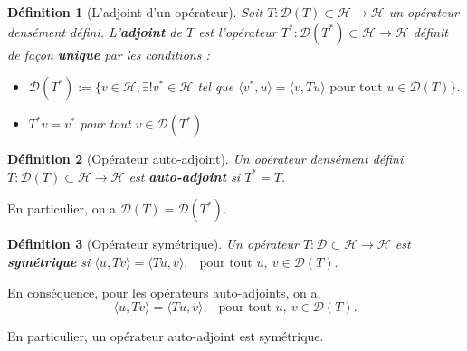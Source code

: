 \documentclass[a4paper, 12pt]{report}
\newcommand{\ra}[1][]{\overset{#1}{\rightarrow}} %
\renewcommand{\.}{\cdot} %
\theoremstyle{break}
\newtheorem{definition}{Définition}
\theoremstyle{remark}
\theoremstyle{proofstyle}
\begin{document}
\begin{definition}[L'adjoint d'un opérateur]
    Soit $T : \mathcal{D}(T) \subset \mathcal{H} \ra \mathcal{H}$ un opérateur densément défini. L'\textbf{adjoint} de $T$ est l'opérateur $T^* : \mathcal{D} (T^*) \subset \mathcal{H} \ra \mathcal{H}$ définit de façon \textbf{unique} par les conditions :
    \begin{itemize}
        \item $\mathcal{D}(T^*) := \{ v \in \mathcal{H} ; \exists ! v^* \in \mathcal{H}$ tel que $\langle v^*, u \rangle = \langle v, T u \rangle \text{ pour tout } u \in \mathcal{D}(T) \}$.
        \item $T^*v= v^*$ pour tout $v \in \mathcal{D}(T^*)$.
    \end{itemize}
\end{definition}

\begin{definition}[Opérateur auto-adjoint]
    Un opérateur densément défini $T : \mathcal{D}(T) \subset \mathcal{H} \ra \mathcal{H}$ est \textbf{auto-adjoint} si $T^* = T$.
\end{definition}
En particulier, on a $\mathcal{D} (T) = \mathcal{D}(T^*)$.

\begin{definition}[Opérateur symétrique]
    Un opérateur $T : \mathcal{D} \subset \mathcal{H} \ra \mathcal{H}$ est \textbf{ symétrique } si
    $\langle u, Tv \rangle = \langle T u, v \rangle, ~~\text{ pour tout } u, ~v \in \mathcal{D}(T).$
\end{definition}

En conséquence, pour les opérateurs auto-adjoints, on a,
$$\langle u, T v \rangle = \langle T u, v \rangle, ~~\text{ pour tout } u,~v \in \mathcal{D}(T).$$

En particulier, un opérateur auto-adjoint est symétrique.\vspace{10 pt}

\end{document}
